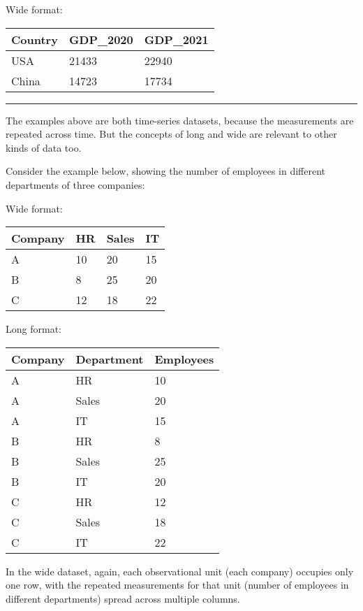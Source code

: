 \documentclass[
  letterpaper,
  DIV=11,
  numbers=noendperiod]{scrreprt}
\begin{document}
Wide format:

\begin{longtable}[]{@{}lll@{}}
\toprule\noalign{}
Country & GDP\_2020 & GDP\_2021 \\
\midrule\noalign{}
\endhead
\bottomrule\noalign{}
\endlastfoot
USA & 21433 & 22940 \\
China & 14723 & 17734 \\
\end{longtable}

\begin{center}\rule{0.5\linewidth}{0.5pt}\end{center}

The examples above are both time-series datasets, because the
measurements are repeated across time. But the concepts of long and wide
are relevant to other kinds of data too.

Consider the example below, showing the number of employees in different
departments of three companies:

Wide format:

\begin{longtable}[]{@{}llll@{}}
\toprule\noalign{}
Company & HR & Sales & IT \\
\midrule\noalign{}
\endhead
\bottomrule\noalign{}
\endlastfoot
A & 10 & 20 & 15 \\
B & 8 & 25 & 20 \\
C & 12 & 18 & 22 \\
\end{longtable}

Long format:

\begin{longtable}[]{@{}lll@{}}
\toprule\noalign{}
Company & Department & Employees \\
\midrule\noalign{}
\endhead
\bottomrule\noalign{}
\endlastfoot
A & HR & 10 \\
A & Sales & 20 \\
A & IT & 15 \\
B & HR & 8 \\
B & Sales & 25 \\
B & IT & 20 \\
C & HR & 12 \\
C & Sales & 18 \\
C & IT & 22 \\
\end{longtable}

In the wide dataset, again, each observational unit (each company)
occupies only one row, with the repeated measurements for that unit
(number of employees in different departments) spread across multiple
columns.
\end{document}
